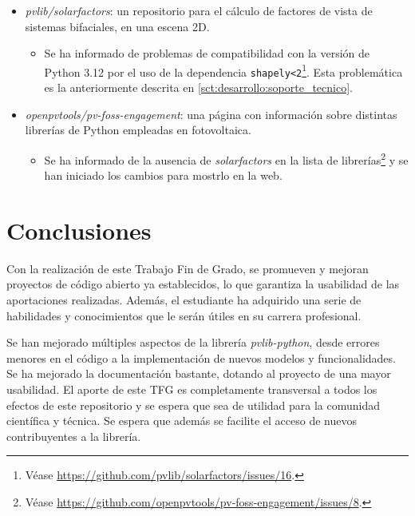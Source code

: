 \begin{itemize}
    \item \textit{pvlib/solarfactors}: un repositorio para el cálculo de factores de vista de sistemas bifaciales, en una escena 2D.
    \begin{itemize}
        \item Se ha informado de problemas de compatibilidad con la versión de Python 3.12 por el uso de la dependencia \texttt{shapely<2}\footnote{Véase \url{https://github.com/pvlib/solarfactors/issues/16}.}. Esta problemática es la anteriormente descrita en \ref{sct:desarrollo:soporte_tecnico}.
    \end{itemize}
    \item \textit{openpvtools/pv-foss-engagement}: una página con información sobre distintas librerías de Python empleadas en fotovoltaica.
    \begin{itemize}
        \item Se ha informado de la ausencia de \textit{solarfactors} en la lista de librerías\footnote{Véase \url{https://github.com/openpvtools/pv-foss-engagement/issues/8}.} y se han iniciado los cambios para mostrlo en la web.
    \end{itemize}
\end{itemize}


\section{Conclusiones} \label{sct:resultados:conclusiones}

Con la realización de este Trabajo Fin de Grado, se promueven y mejoran proyectos de código abierto ya establecidos, lo que garantiza la usabilidad de las aportaciones realizadas. Además, el estudiante ha adquirido una serie de habilidades y conocimientos que le serán útiles en su carrera profesional.

Se han mejorado múltiples aspectos de la librería \textit{pvlib-python}, desde errores menores en el código a la implementación de nuevos modelos y funcionalidades. Se ha mejorado la documentación bastante, dotando al proyecto de una mayor usabilidad. El aporte de este TFG es completamente transversal a todos los efectos de este repositorio y se espera que sea de utilidad para la comunidad científica y técnica. Se espera que además se facilite el acceso de nuevos contribuyentes a la librería.

